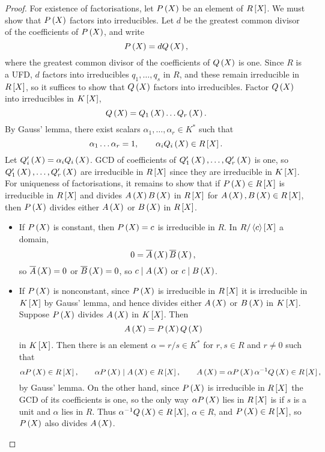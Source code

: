 \begin{proof}
For existence of factorisations, let $ P\br{X} $ be an element of $ R\sbr{X} $. We must show that $ P\br{X} $ factors into irreducibles. Let $ d $ be the greatest common divisor of the coefficients of $ P\br{X} $, and write
$$ P\br{X} = dQ\br{X}, $$
where the greatest common divisor of the coefficients of $ Q\br{X} $ is one. Since $ R $ is a UFD, $ d $ factors into irreducibles $ q_1, \dots, q_s $ in $ R $, and these remain irreducible in $ R\sbr{X} $, so it suffices to show that $ Q\br{X} $ factors into irreducibles. Factor $ Q\br{X} $ into irreducibles in $ K\sbr{X} $,
$$ Q\br{X} = Q_1\br{X} \dots Q_r\br{X}. $$
By Gauss' lemma, there exist scalars $ \alpha_1, \dots, \alpha_r \in K^* $ such that
$$ \alpha_1 \dots \alpha_r = 1, \qquad \alpha_iQ_i\br{X} \in R\sbr{X}. $$
Let $ Q'_i \br{X} = \alpha_iQ_i\br{X} $. GCD of coefficients of $ Q'_1\br{X}, \dots, Q'_r\br{X} $ is one, so $ Q'_1\br{X}, \dots, Q'_r\br{X} $ are irreducible in $ R\sbr{X} $ since they are irreducible in $ K\sbr{X} $. For uniqueness of factorisations, it remains to show that if $ P\br{X} \in R\sbr{X} $ is irreducible in $ R\sbr{X} $ and divides $ A\br{X}B\br{X} $ in $ R\sbr{X} $ for $ A\br{X}, B\br{X} \in R\sbr{X} $, then $ P\br{X} $ divides either $ A\br{X} $ or $ B\br{X} $ in $ R\sbr{X} $.
\begin{itemize}
\item If $ P\br{X} $ is constant, then $ P\br{X} = c $ is irreducible in $ R $. In $ R / \abr{c}\sbr{X} $ a domain,
$$ 0 = \overline{A}\br{X}\overline{B}\br{X}, $$
so $ \overline{A}\br{X} = 0 $ or $ \overline{B}\br{X} = 0 $, so $ c \mid A\br{X} $ or $ c \mid B\br{X} $.
\item If $ P\br{X} $ is nonconstant, since $ P\br{X} $ is irreducible in $ R\sbr{X} $ it is irreducible in $ K\sbr{X} $ by Gauss' lemma, and hence divides either $ A\br{X} $ or $ B\br{X} $ in $ K\sbr{X} $. Suppose $ P\br{X} $ divides $ A\br{X} $ in $ K\sbr{X} $. Then
$$ A\br{X} = P\br{X}Q\br{X} $$
in $ K\sbr{X} $. Then there is an element $ \alpha = r / s \in K^* $ for $ r, s \in R $ and $ r \ne 0 $ such that
$$ \alpha P\br{X} \in R\sbr{X}, \qquad \alpha P\br{X} \mid A\br{X} \in R\sbr{X}, \qquad A\br{X} = \alpha P\br{X}\alpha^{-1} Q\br{X} \in R\sbr{X}, $$
by Gauss' lemma. On the other hand, since $ P\br{X} $ is irreducible in $ R\sbr{X} $ the GCD of its coefficients is one, so the only way $ \alpha P\br{X} $ lies in $ R\sbr{X} $ is if $ s $ is a unit and $ \alpha $ lies in $ R $. Thus $ \alpha^{-1}Q\br{X} \in R\sbr{X} $, $ \alpha \in R $, and $ P\br{X} \in R\sbr{X} $, so $ P\br{X} $ also divides $ A\br{X} $.
\end{itemize}
\end{proof}


